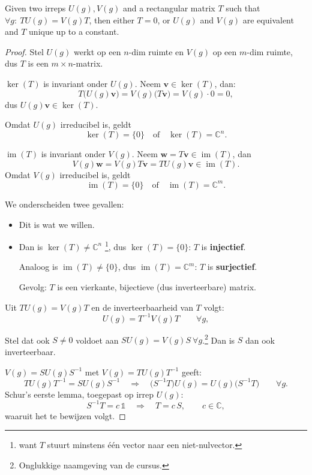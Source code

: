 \begin{theorem}
    Given two irreps \(U(g), V(g)\) and a rectangular matrix \(T\) such that \(\forall g : \ TU(g) = V(g)T\),
    then either \(T = 0\), or \(U(g)\) and \(V(g)\) are equivalent and \(T\) unique up to a constant.
\end{theorem}

\begin{proof}
    Stel \(U(g)\) werkt op een \(n\)-dim ruimte en \(V(g)\) op een \(m\)-dim ruimte, dus \(T\) is een \(m \times n\)-matrix.

    \(\ker (T)\) is invariant onder \(U(g)\). Neem \(\bm v \in \ker (T)\), dan:
    \[
        T\big(U(g) \bm v\big) = V(g)\big(T \bm v\big) = V(g)\cdot 0 = 0,
    \]
    dus \(U(g) \bm v \in \ker (T)\). 
    
    Omdat \(U(g)\) irreducibel is, geldt
    \[
        \ker (T) = \{0\} \quad \text{of} \quad \ker (T) = \mathbb{C}^n.
    \]

    \(\operatorname{im} (T)\) is invariant onder \(V(g)\). Neem \(\bm w = T \bm v \in \operatorname{im} (T)\), dan
    \[
        V(g) \bm w = V(g)T \bm v = T U(g) \bm v \in \operatorname{im} (T).
    \]
    Omdat \(V(g)\) irreducibel is, geldt
    \[
        \operatorname{im} (T) = \{0\} \quad \text{of} \quad \operatorname{im} (T) = \mathbb{C}^m.
    \]

    We onderscheiden twee gevallen:
    \begin{itemize}
        \item[\(T = 0\):] Dit is wat we willen.
        \item [\(T \neq 0\):] Dan is \(\ker (T) \neq \mathbb{C}^n\) \footnote{want \(T\) stuurt minstens één vector naar een niet-nulvector.},
        dus \(\ker (T) = \{0\}\): \(T\) is \textbf{injectief}.

        Analoog is \(\operatorname{im} (T) \neq \{0\}\), dus \(\operatorname{im} (T) = \mathbb{C}^m\): \(T\) is \textbf{surjectief}.

        Gevolg: \(T\) is een vierkante, bijectieve (dus inverteerbare) matrix.
    \end{itemize}

   Uit \(TU(g) = V(g)T\) en de inverteerbaarheid van \(T\) volgt:
    \[
        U(g) = T^{-1}V(g)T \qquad \forall g,
    \]

    Stel dat ook \(S \neq 0\) voldoet aan \(SU(g) = V(g)S \ \forall g\).\footnote{Onglukkige naamgeving van de cursus.}
    Dan is \(S\) dan ook inverteerbaar. 
    
    \(V(g) = SU(g)S^{-1}\) met \(V(g) = TU(g)T^{-1}\) geeft:
    \[
        TU(g)T^{-1} = SU(g)S^{-1} \quad\Longrightarrow\quad \big(S^{-1}T\big)U(g) = U(g)\big(S^{-1}T\big) \qquad \forall g.
    \]
    Schur's eerste lemma, toegepast op irrep \(U(g)\):
    \[
        S^{-1}T = c\,\mathds{1} \quad\Longrightarrow\quad T = c\,S, \qquad c \in \mathbb{C},
    \]
    waaruit het te bewijzen volgt.
\end{proof}
